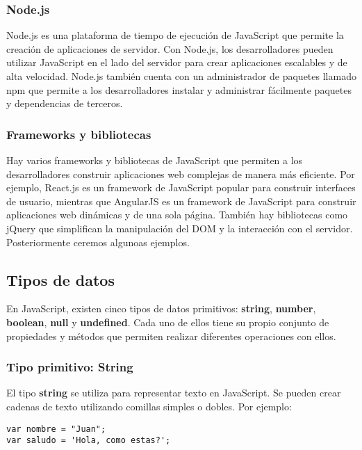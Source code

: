 \documentclass[executivepaper]{article}
\begin{document}
\subsubsection*{Node.js}

Node.js es una plataforma de tiempo de ejecución de JavaScript que permite la creación de aplicaciones de servidor. Con Node.js, los desarrolladores pueden utilizar JavaScript en el lado del servidor para crear aplicaciones escalables y de alta velocidad. Node.js también cuenta con un administrador de paquetes llamado npm que permite a los desarrolladores instalar y administrar fácilmente paquetes y dependencias de terceros.

\subsubsection*{Frameworks y bibliotecas}

Hay varios frameworks y bibliotecas de JavaScript que permiten a los desarrolladores construir aplicaciones web complejas de manera más eficiente. Por ejemplo, React.js es un framework de JavaScript popular para construir interfaces de usuario, mientras que AngularJS es un framework de JavaScript para construir aplicaciones web dinámicas y de una sola página. También hay bibliotecas como jQuery que simplifican la manipulación del DOM y la interacción con el servidor.\\

Posteriormente ceremos algunoas ejemplos.

\subsection{Tipos de datos}

En JavaScript, existen cinco tipos de datos primitivos: \textbf{string}, \textbf{number}, \textbf{boolean}, \textbf{null} y \textbf{undefined}. Cada uno de ellos tiene su propio conjunto de propiedades y métodos que permiten realizar diferentes operaciones con ellos.

\subsubsection*{Tipo primitivo: String}

El tipo \textbf{string} se utiliza para representar texto en JavaScript. Se pueden crear cadenas de texto utilizando comillas simples o dobles. Por ejemplo:

\begin{lstlisting}
var nombre = "Juan";
var saludo = 'Hola, como estas?';
\end{lstlisting}
\end{document}
